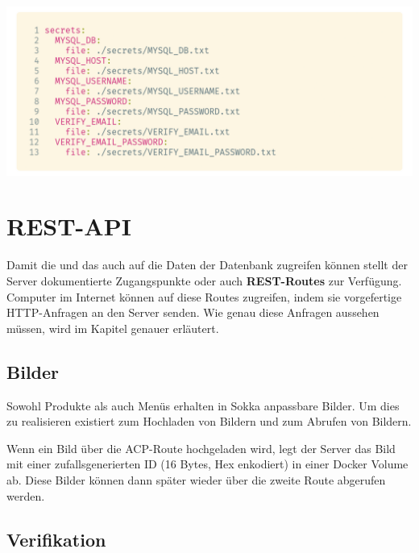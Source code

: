 \begin{code}[htp]
    \begin{center}
        \includegraphics[width=1\textwidth]{images/Backend/secrets.png}
        \caption{Sokkas Docker Secrets in der \lstinline{docker-compose.yml}}
    \end{center}
\end{code}

\section{REST-API}

Damit die \textit{} und das \textit{} auch auf die Daten der Datenbank zugreifen können stellt der Server dokumentierte Zugangspunkte oder auch \textbf{REST-Routes} zur Verfügung. Computer im Internet können auf diese Routes zugreifen, indem sie vorgefertige HTTP-Anfragen an den Server senden. Wie genau diese Anfragen aussehen müssen, wird im Kapitel \textit{} genauer erläutert.

\subsection{Bilder}

Sowohl Produkte als auch Menüs erhalten in Sokka anpassbare Bilder. Um dies zu realisieren existiert \textit{} zum Hochladen von Bildern und \textit{} zum Abrufen von Bildern.

Wenn ein Bild über die ACP-Route hochgeladen wird, legt der Server das Bild mit einer zufallsgenerierten ID (16 Bytes, Hex enkodiert) in einer Docker Volume ab. Diese Bilder können dann später wieder über die zweite Route abgerufen werden.

\subsection{Verifikation}

